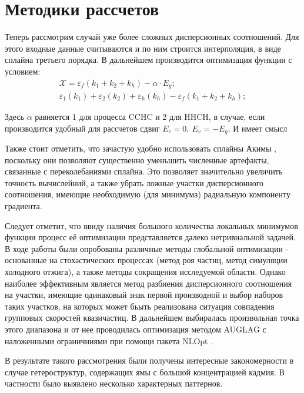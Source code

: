 \documentclass[../main.tex]{subfiles}
\begin{document}
        \section{Методики рассчетов}
        Теперь рассмотрим случай уже более сложных дисперсионных соотношений.
        Для этого входные данные считываются и по ним строится интерполяция,
        в виде сплайна третьего порядка. В дальнейшем производится оптимизация функции с условием:
        \begin{equation}
            \begin{array}{l}
                \mathcal{X}  = \varepsilon_f(k_1 + k_2 + k_h) - \alpha \cdot E_g;\\
                \varepsilon_1(k_1) + \varepsilon_2(k_2) + \varepsilon_h(k_h) - \varepsilon_f(k_1 + k_2 + k_h);
            \end{array}
        \end{equation}

        Здесь $\alpha$ равняется 1 для процесса CCHC и 2 для HHCH, в случае, если производится 
        удобный для рассчетов сдвиг $E_c = 0,~E_v = -E_g$. И имеет смысл 

        Также стоит отметить, что зачастую удобно использовать сплайны Акимы \cite{AkimaSplines}, поскольку они позволяют существенно уменьшить
        численные артефакты, связанные с переколебаниями сплайна. Это позволяет значительно увеличить точность вычислейний, а также убрать ложные
        участки дисперсионного соотношения, имеющие необходимую (для минимума) радиальную компоненту градиента.

        Следует отметит, что ввиду наличия большого количества локальных минимумов функции процесс её оптимизации представляется далеко нетривиальной задачей.
        В ходе работы были опробованы различные методы глобальной оптимизации - основанные на стохастических процессах (метод роя частиц, метод 
        симуляции холодного отжига), а также методы сокращения исследуемой области. Однако наиболее эффективным является метод разбиения 
        дисперсионного соотношения на участки, имеющие одинаковый знак первой производной и выбор наборов таких участков,
        на которых может бьыть реализована ситуация совпадения групповых скоростей квазичастиц. В дальнейшем выбиралась произвольная точка этого диапазона
        и от нее проводилась оптимизация методом AUGLAG \cite{AuglagOptim} с наложенными ограничниями при помощи пакета NLOpt \cite{NLopt}.

        В результате такого рассмотрения были получены интересные закономерности в случае гетероструктур, содержащих ямы с большой концентрацией кадмия.
        В частности было выявлено несколько характерных паттернов.
        
\end{document}
